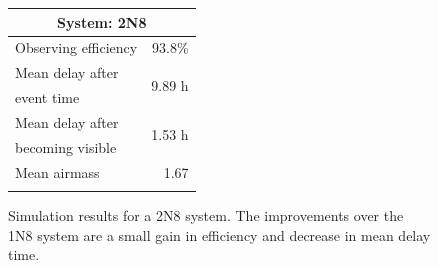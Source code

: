 \begin{colsection}
\begin{colsection}
\begin{figure}[p]
\begin{center}
\begin{minipage}[t]{0.35\textwidth}
\begin{tabular}{lr}
\multicolumn{2}{c}{\textbf{System: 2N8}} \\
\midrule
Observing efficiency & 93.8\% \\
\midrule
Mean delay after     & \multirow{2}{*}{9.89 h} \\
event time           & \\
Mean delay after     & \multirow{2}{*}{1.53 h} \\
becoming visible     & \\
\midrule
Mean airmass         & 1.67 \\
& \\
\end{tabular}
\vfill
\end{minipage}

\end{center}
\caption[Simulation results: 2N8 system]{Simulation results for a 2N8 system. The improvements over the 1N8 system are a small gain in efficiency and decrease in mean delay time.
}
\label{fig:sim_2n8}
\end{figure}


\begin{figure}[p]
\begin{center}


\end{center}
\end{figure}
\end{colsection}
\end{colsection}
